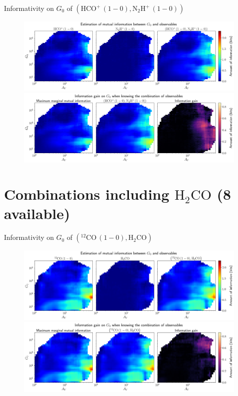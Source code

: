 \documentclass{beamer}
\begin{document}
\begin{frame}{Informativity on $G_0$ of $\left(\mathrm{HCO^+\,(1-0)},\mathrm{N_2H^+\,(1-0)}\right)$}
    \begin{figure}
        \centering
        \includegraphics[width=0.95\linewidth]{../mi/g0__hcop10_n2hp10_mi.png}
        \vfill
        \includegraphics[width=0.95\linewidth]{../mi/g0__hcop10_n2hp10_mi_gain.png}
    \end{figure}
\end{frame}

\section{Combinations including $\mathrm{H_2CO}$ (8 available)}

\begin{frame}{Informativity on $G_0$ of $\left(\mathrm{^{12}CO\,(1-0)},\mathrm{H_2CO}\right)$}
    \begin{figure}
        \centering
        \includegraphics[width=0.95\linewidth]{../mi/g0__12co10_h2co_mi.png}
        \vfill
        \includegraphics[width=0.95\linewidth]{../mi/g0__12co10_h2co_mi_gain.png}
    \end{figure}
\end{frame}
\end{document}
